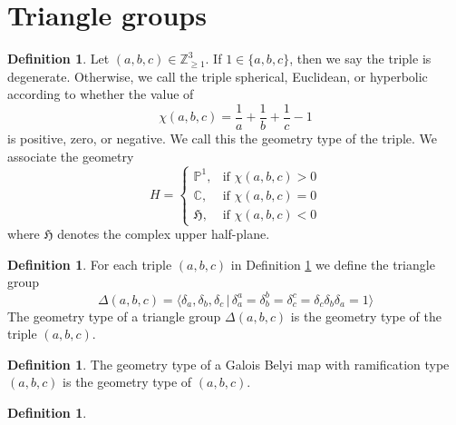 \documentclass{dcthesis}
\newcommand{\PP}{\mathbb P}
\newcommand{\CC}{\mathbb C}
\newcommand{\ZZ}{\mathbb Z}
\newcommand{\defi}[1]{\textsf{#1}}
\numberwithin{equation}{section}
\theoremstyle{definition}
\newtheorem{definition}[equation]{Definition}
\theoremstyle{remark}
\begin{document}
{{  \section{Triangle groups}{\label{sec:trianglegroups}
    \begin{definition}
      \label{def:geometrytype}
      Let $(a,b,c)\in\ZZ_{\geq 1}^3$.
      If $1\in\{a,b,c\}$, then we say the triple is \defi{degenerate}.
      Otherwise, we call the triple
      \defi{spherical},
      \defi{Euclidean},
      or \defi{hyperbolic}
      according to whether the value of
      \begin{equation}
        \label{eqn:eulerchar}
        \chi(a,b,c) = \frac{1}{a}+\frac{1}{b}
        +\frac{1}{c}-1
      \end{equation}
      is positive, zero, or negative.
      We call this the \defi{geometry type}
      of the triple.
      We associate the \defi{geometry}
      \begin{equation}
        \label{eqn:geometrytype}
        H=
        \begin{cases}
          \PP^1,&\text{if }\chi(a,b,c)>0\\
          \CC,&\text{if }\chi(a,b,c)=0\\
          \mathfrak{H},&\text{if }\chi(a,b,c)<0
        \end{cases}
      \end{equation}
      where $\mathfrak{H}$ denotes the complex upper half-plane.
    \end{definition}
    \begin{definition}
      \label{def:trianglegroup}
      For each triple $(a,b,c)$ in Definition \ref{def:geometrytype}
      we define the \defi{triangle group}
      \begin{equation}
        \label{eqn:trianglegroup}
        \Delta(a,b,c)
        =
        \langle
        \delta_a, \delta_b, \delta_c \,|\,
        \delta_a^a=\delta_b^b=\delta_c^c=\delta_c\delta_b\delta_a=1
        \rangle
      \end{equation}
      The \defi{geometry type}
      of a triangle group $\Delta(a,b,c)$
      is the geometry type of the triple $(a,b,c)$.
    \end{definition}
    \begin{definition}\label{def:geometrytypeofbelyimap}
      The \defi{geometry type} of a Galois Belyi map
      with ramification type $(a,b,c)$
      is the geometry type of $(a,b,c)$.
    \end{definition}
    \begin{definition}\label{def:geometrytypeofpermutationtriple}

\end{definition}}}}
\end{document}
